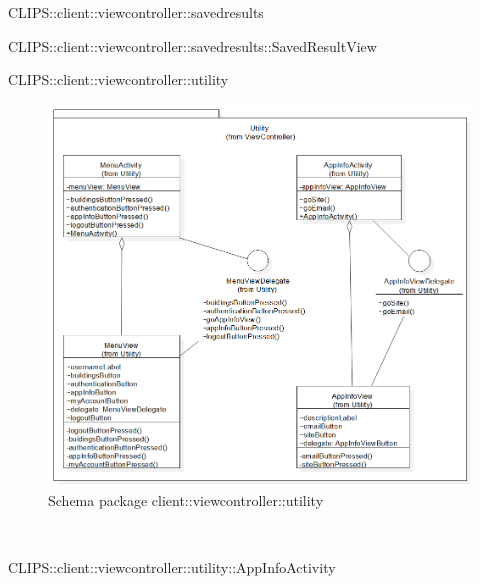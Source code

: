 \begin{componente}{CLIPS::client::viewcontroller::savedresults}
\begin{compClassi}
\begin{classe}{CLIPS::client::viewcontroller::savedresults::SavedResultView}
\begin{classeRelazioni}
\end{classeRelazioni}
\end{classe}\end{compClassi}
\end{componente}
\begin{componente}{CLIPS::client::viewcontroller::utility}
\begin{figure}[h!]
\centering
\includegraphics[scale=0.4]{img/package/png/client--viewcontroller--utility.png}
\caption{Schema package client::viewcontroller::utility}
 \end{figure}
\begin{compClassi} \\
\begin{classe}{CLIPS::client::viewcontroller::utility::AppInfoActivity}
\begin{classeRelazioni}

\end{classeRelazioni}
\end{classe}
\end{compClassi}
\end{componente}
